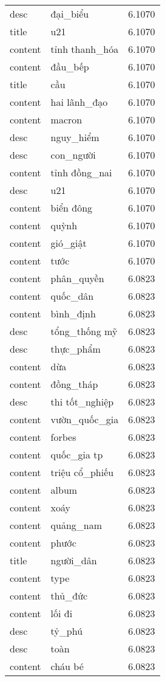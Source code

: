 \documentclass{article}
\begin{document}
\begin{tabular}{lll}
desc & đại\_biểu & 6.1070\\
title & u21 & 6.1070\\
content & tỉnh thanh\_hóa & 6.1070\\
content & đầu\_bếp & 6.1070\\
title & cầu & 6.1070\\
content & hai lãnh\_đạo & 6.1070\\
content & macron & 6.1070\\
desc & nguy\_hiểm & 6.1070\\
desc & con\_người & 6.1070\\
content & tỉnh đồng\_nai & 6.1070\\
desc & u21 & 6.1070\\
content & biển đông & 6.1070\\
content & quỳnh & 6.1070\\
content & gió\_giật & 6.1070\\
content & tước & 6.1070\\
content & phân\_quyền & 6.0823\\
content & quốc\_dân & 6.0823\\
content & bình\_định & 6.0823\\
desc & tổng\_thống mỹ & 6.0823\\
desc & thực\_phẩm & 6.0823\\
content & dừa & 6.0823\\
content & đồng\_tháp & 6.0823\\
desc & thi tốt\_nghiệp & 6.0823\\
content & vườn\_quốc\_gia & 6.0823\\
content & forbes & 6.0823\\
content & quốc\_gia tp & 6.0823\\
content & triệu cổ\_phiếu & 6.0823\\
content & album & 6.0823\\
content & xoáy & 6.0823\\
content & quảng\_nam & 6.0823\\
content & phước & 6.0823\\
title & người\_dân & 6.0823\\
content & type & 6.0823\\
content & thủ\_đức & 6.0823\\
content & lối đi & 6.0823\\
desc & tỷ\_phú & 6.0823\\
desc & toàn & 6.0823\\
content & cháu bé & 6.0823\\

\end{tabular}
\end{document}
